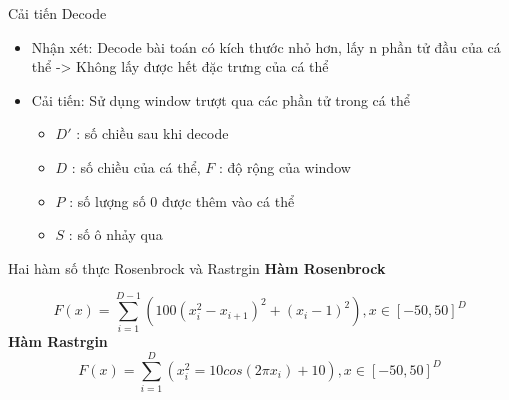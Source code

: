 \documentclass[compress]{beamer}
\begin{document}
\begin{frame}{Cải tiến Decode}
\begin{itemize}
\item Nhận xét: Decode bài toán có kích thước nhỏ hơn, lấy n phần tử đầu của cá thể -> Không lấy được hết đặc trưng của cá thể
\item Cải tiến: Sử dụng window trượt qua các phần tử trong cá thể

\begin{itemize}
\item $D'$ : số chiều sau khi decode
\item $D$ : số chiều của cá thể, $F$ : độ rộng của window
\item $P$ : số lượng số 0 được thêm vào cá thể 
\item $S$ : số ô nhảy qua  
\end{itemize}
\end{itemize}
\end{frame}
\begin{frame}{Hai hàm số thực Rosenbrock và Rastrgin}
\textbf{Hàm Rosenbrock} 

$$F(x)=\sum_{i=1}^{D-1}(100(x_i^2-x_{i+1})^2+(x_i-1)^2),x \in [-50,50]^D $$
\textbf{Hàm Rastrgin}
$$F(x)=\sum_{i=1}^D(x_i^2=10cos(2\pi x_i)+10),x \in [-50,50]^D$$
\end{frame}
\end{document}
